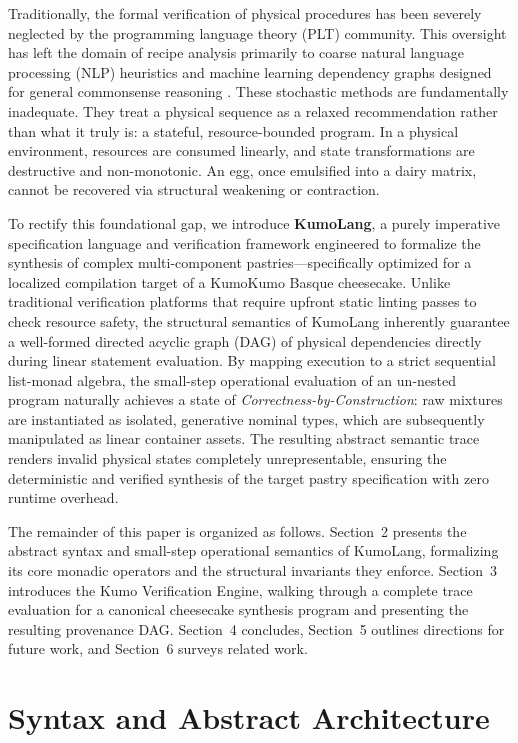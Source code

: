 \documentclass[11pt, a4paper]{article}
\begin{document}
Traditionally, the formal verification of physical procedures has been severely neglected by the programming language theory (PLT) community. This oversight has left the domain of recipe analysis primarily to coarse natural language processing (NLP) heuristics and machine learning dependency graphs designed for general commonsense reasoning \cite{commonsense}. These stochastic methods are fundamentally inadequate. They treat a physical sequence as a relaxed recommendation rather than what it truly is: a stateful, resource-bounded program. In a physical environment, resources are consumed linearly, and state transformations are destructive and non-monotonic. An egg, once emulsified into a dairy matrix, cannot be recovered via structural weakening or contraction.

To rectify this foundational gap, we introduce \textbf{KumoLang}, a purely imperative specification language and verification framework engineered to formalize the synthesis of complex multi-component pastries—specifically optimized for a localized compilation target of a KumoKumo Basque cheesecake. Unlike traditional verification platforms that require upfront static linting passes to check resource safety, the structural semantics of KumoLang inherently guarantee a well-formed directed acyclic graph (DAG) of physical dependencies directly during linear statement evaluation. By mapping execution to a strict sequential list-monad algebra, the small-step operational evaluation of an un-nested program naturally achieves a state of \emph{Correctness-by-Construction}: raw mixtures are instantiated as isolated, generative nominal types, which are subsequently manipulated as linear container assets. The resulting abstract semantic trace renders invalid physical states completely unrepresentable, ensuring the deterministic and verified synthesis of the target pastry specification with zero runtime overhead.

The remainder of this paper is organized as follows. Section~2 presents the abstract syntax and small-step operational semantics of KumoLang, formalizing its core monadic operators and the structural invariants they enforce. Section~3 introduces the Kumo Verification Engine, walking through a complete trace evaluation for a canonical cheesecake synthesis program and presenting the resulting provenance DAG. Section~4 concludes, Section~5 outlines directions for future work, and Section~6 surveys related work.

\section{Syntax and Abstract Architecture}
\end{document}
